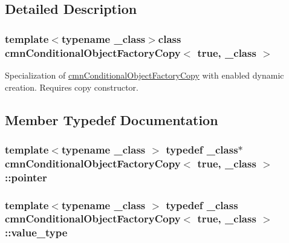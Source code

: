 \subsection{Detailed Description}
\subsubsection*{template$<$typename \+\_\+class$>$class cmn\+Conditional\+Object\+Factory\+Copy$<$ true, \+\_\+class $>$}

Specialization of \hyperlink{classcmn_conditional_object_factory_copy}{cmn\+Conditional\+Object\+Factory\+Copy} with enabled dynamic creation. Requires copy constructor. 

\subsection{Member Typedef Documentation}
\hypertarget{classcmn_conditional_object_factory_copy_3_01true_00_01__class_01_4_af5fd377a8880cde0f6579e8e35a3d3ef}{}
\subsubsection[{pointer}]{\setlength{\rightskip}{0pt plus 5cm}template$<$typename \+\_\+class $>$ typedef \+\_\+class$\ast$ {\bf cmn\+Conditional\+Object\+Factory\+Copy}$<$ true, \+\_\+class $>$\+::{\bf pointer}}\label{classcmn_conditional_object_factory_copy_3_01true_00_01__class_01_4_af5fd377a8880cde0f6579e8e35a3d3ef}
\hypertarget{classcmn_conditional_object_factory_copy_3_01true_00_01__class_01_4_ad1492fd9e525d85f29807a26148f082e}{}
\subsubsection[{value\+\_\+type}]{\setlength{\rightskip}{0pt plus 5cm}template$<$typename \+\_\+class $>$ typedef \+\_\+class {\bf cmn\+Conditional\+Object\+Factory\+Copy}$<$ true, \+\_\+class $>$\+::{\bf value\+\_\+type}}\label{classcmn_conditional_object_factory_copy_3_01true_00_01__class_01_4_ad1492fd9e525d85f29807a26148f082e}


